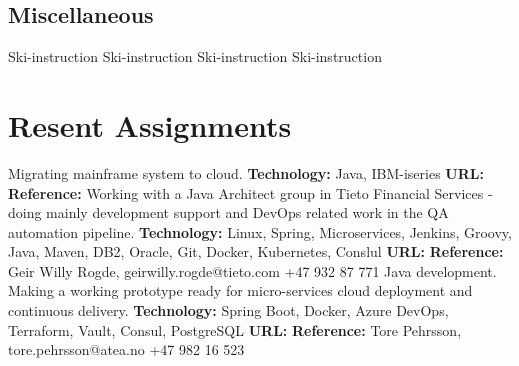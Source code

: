 \documentclass[11pt,a4paper,sans]{moderncv} %
\begin{document}
\subsection{Miscellaneous}
{\newline{}}
{Ski-instruction}
{\newline{}}
{}
{\newline{}}
{Ski-instruction}
{\newline{}}
{Ski-instruction}
{\newline{}}{Ski-instruction}

\pagebreak


\section{Resent Assignments}

{
Migrating mainframe system to cloud.
\newline{}\textbf{Technology:}
Java, IBM-iseries
\newline{}\textbf{URL:} \httplink{}
\newline{}\textbf{Reference:} 
}
{
Working with a Java Architect group in Tieto Financial Services - doing mainly development support and DevOps related work in the QA automation pipeline.
\newline{}\textbf{Technology:}
Linux, Spring, Microservices, Jenkins, Groovy, Java, Maven, DB2, Oracle, Git, Docker, Kubernetes, Conslul
\newline{}\textbf{URL:} 
\newline{}\textbf{Reference:} Geir Willy Rogde, geirwilly.rogde@tieto.com +47 932 87 771
}
{
Java development. Making a working prototype ready for micro-services cloud deployment and continuous delivery.
\newline{}\textbf{Technology:}
Spring Boot, Docker, Azure DevOps, Terraform, Vault, Consul, PostgreSQL
\newline{}\textbf{URL:} 
\newline{}\textbf{Reference:} Tore Pehrsson, tore.pehrsson@atea.no +47 982 16 523
}
\end{document}
